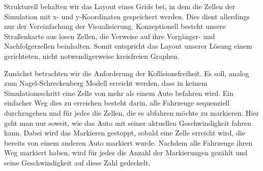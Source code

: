 \documentclass[11pt, a4paper]{article}
\begin{document}
Strukturell behalten wir das Layout eines Grids bei, in dem die Zellen der Simulation mit x- und y-Koordinaten gespeichert werden. Dies dient allerdings nur der Vereinfachung der Visualisierung. Konzeptionell besteht unsere Straßenkarte aus losen Zellen, die Verweise auf ihre Vorgänger- und Nachfolgerzellen beinhalten. Somit entspricht das Layout unserer Lösung einem gerichteten, nicht notwendigerweise kreisfreien Graphen.

Zunächst betrachten wir die Anforderung der Kollisionsfreiheit. Es soll, analog zum Nagel-Schreckenberg Modell \cite{nagel-schreckenberg} erreicht werden, dass in keinem Simulationsschritt eine Zelle von mehr als einem Auto befahren wird. Ein einfacher Weg dies zu erreichen besteht darin, alle Fahrzeuge sequenziell durchzugehen und für jedes die Zellen, die es abfahren möchte zu markieren. Hier geht man nur soweit, wie das Auto mit seiner aktuellen Geschwindigkeit fahren kann. Dabei wird das Markieren gestoppt, sobald eine Zelle erreicht wird, die bereits von einem anderen Auto markiert wurde. Nachdem alle Fahrzeuge ihren Weg markiert haben, wird für jedes die Anzahl der Markierungen gezählt und seine Geschwindigkeit auf diese Zahl gedeckelt.
\end{document}
